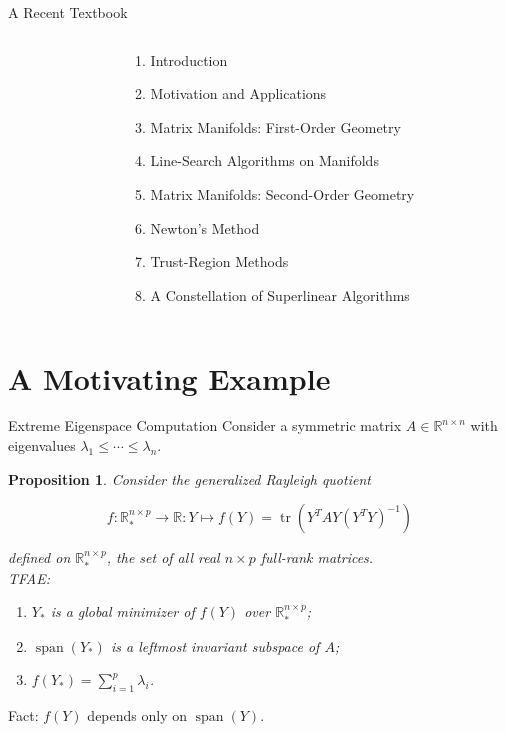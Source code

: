 \documentclass[xcolor=dvipsnames,t]{beamer} %
\newcommand{\reals}{\mathbb{R}}
\newtheorem*{proposition*}{Proposition}
\begin{document}
\begin{frame}{A Recent Textbook}
\begin{columns}
\begin{column}{0.4\textwidth}
      \end{column}
      \begin{column}{0.6\textwidth}
         {\footnotesize
         \begin{enumerate}[1.]
            \item Introduction
            \item Motivation and Applications
            \item Matrix Manifolds: First-Order Geometry
            \item Line-Search Algorithms on Manifolds
            \item Matrix Manifolds: Second-Order Geometry
            \item Newton's Method
            \item Trust-Region Methods
            \item A Constellation of Superlinear Algorithms
         \end{enumerate}
         }
      \end{column}
   \end{columns}
\end{frame}


\section{A Motivating Example}
\begin{frame}{Extreme Eigenspace Computation}
   Consider a symmetric matrix $A\in\reals^{n\times n}$ with eigenvalues $\lambda_1\le \cdots \le \lambda_n$.

   \begin{proposition*}
      Consider the \emph{generalized Rayleigh quotient}
      
      \[ f:\reals^{n\times p}_\ast \to \reals : Y \mapsto f(Y) = \operatorname{tr}(Y^TAY(Y^TY)^{-1}) \] 

      \noindent defined on $\reals^{n\times p}_\ast$, the set of all real $n\times p$ full-rank matrices.\\

      TFAE:
      \begin{enumerate}[1.]
         \item $Y_\ast$ is a global minimizer of $f(Y)$ over $\reals^{n\times p}_\ast$;
         \item $\operatorname{span}(Y_\ast)$ is a leftmost invariant subspace of $A$;
         \item $f(Y_\ast) = \sum_{i=1}^p \lambda_i$.
      \end{enumerate}
   \end{proposition*}

   Fact: $f(Y)$ depends only on $\operatorname{span}(Y)$.

\end{frame}
\end{document}
